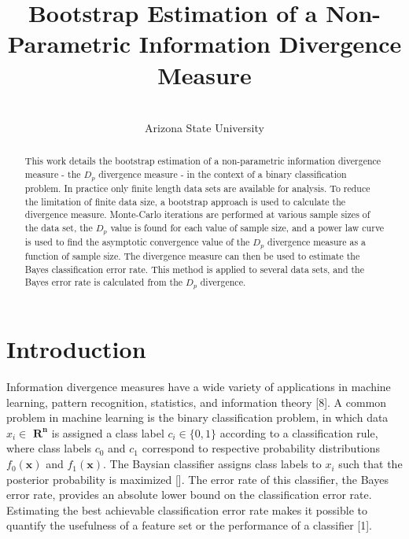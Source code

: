 \documentclass{article}
\begin{document}
	\title{Bootstrap Estimation of a Non-Parametric Information Divergence Measure}
	\author { \\
		\small Arizona State University}
	\date{}
	\maketitle

	\begin{abstract}
		
		This work details the bootstrap estimation of a non-parametric information divergence measure - the $D_p$ divergence measure - in the context of a binary classification problem. In practice only finite length data sets are available for analysis. To reduce the limitation of finite data size, a bootstrap approach is used to calculate the divergence measure. Monte-Carlo iterations are performed at various sample sizes of the data set, the $D_p$ value is found for each value of sample size, and a power law curve is used to find the asymptotic convergence value of the $D_p$ divergence measure as a function of sample size. The divergence measure can then be used to estimate the Bayes classification error rate. This method is applied to several data sets, and the Bayes error rate is calculated from the $D_p$ divergence.
	\end{abstract}

		\section{Introduction}
		\indent Information divergence measures have a wide variety of applications in machine learning, pattern recognition, statistics, and information theory [8]. A common problem in machine learning is the binary classification problem, in which data $x_i\in$ $\mathbf{R^n}$ is assigned a class label $c_i \in \{0,1\}$ according to a classification rule, where class labels $c_0$ and $c_1$ correspond to respective probability distributions $f_0(\textbf{x})$ and $f_1(\textbf{x})$. The Baysian classifier assigns class labels to $x_i$ such that the posterior probability is maximized []. The error rate of this classifier, the Bayes error rate, provides an absolute lower bound on the classification error rate.  Estimating the best achievable classification error rate makes it possible to quantify the usefulness of a feature set or the performance of a classifier [1]. 
		
\end{document}
